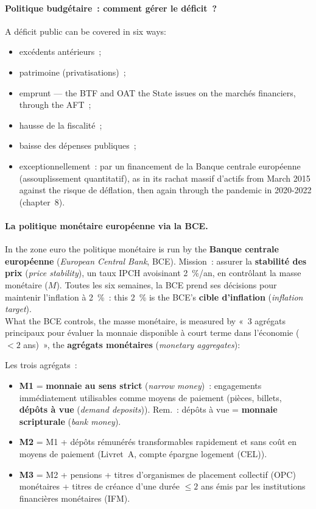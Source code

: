 \paragraph{Politique budgétaire~: comment gérer le déficit~?} A déficit public
can be covered in six ways:
\begin{itemize}
  \item excédents antérieurs~;
  \item patrimoine (privatisations)~;
  \item emprunt --- the BTF and OAT the State issues on the marchés financiers,
    through the AFT~;
  \item hausse de la fiscalité~;
  \item baisse des dépenses publiques~;
  \item exceptionnellement~: par un financement de la Banque centrale européenne
    (assouplissement quantitatif), as in its rachat massif d'actifs from March
    2015 against the risque de déflation, then again through the pandemic in
    2020-2022 (chapter~8).
\end{itemize}

\paragraph{La politique monétaire européenne via la BCE.} In the zone euro the
politique monétaire is run by the \textbf{Banque centrale européenne}
(\textit{European Central Bank}, BCE). Mission~: assurer la \textbf{stabilité des
prix} (\textit{price stability}), un taux IPCH avoisinant 2~\%/an, en
contrôlant la masse monétaire ($M$). Toutes les six semaines, la BCE prend ses
décisions pour maintenir l'inflation à 2~\%~: this 2~\% is the BCE's
\textbf{cible d'inflation} (\textit{inflation target}).\\

What the BCE controls, the masse monétaire, is measured by «~3 agrégats
principaux pour évaluer la monnaie disponible à court terme dans l'économie
($< 2$ ans)~», the \textbf{agrégats monétaires} (\textit{monetary aggregates}):

\begin{definition}[M1, M2, M3]
  Les trois agrégats~:
  \begin{itemize}
    \item \textbf{M1} = \textbf{monnaie au sens strict} (\textit{narrow
      money})~: engagements immédiatement utilisables comme moyens de paiement
      (pièces, billets, \textbf{dépôts à vue} (\textit{demand deposits})). Rem.~:
      dépôts à vue = \textbf{monnaie scripturale} (\textit{bank money}).
    \item \textbf{M2} = M1 + dépôts rémunérés transformables rapidement et sans
      coût en moyens de paiement (Livret~A, compte épargne logement (CEL)).
    \item \textbf{M3} = M2 + pensions + titres d'organismes de placement
      collectif (OPC) monétaires + titres de créance d'une durée $\le 2$ ans émis
      par les institutions financières monétaires (IFM).
  \end{itemize}
\end{definition}

